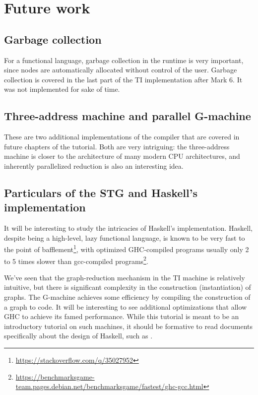 \section{Future work}
\label{sec:future-work}

\subsection{Garbage collection}
\label{sec:gc}

For a functional language, garbage collection in the runtime is very important, since nodes are automatically allocated without control of the user. Garbage collection is covered in the last part of the TI implementation after Mark 6. It was not implemented for sake of time.

\subsection{Three-address machine and parallel G-machine}
\label{sec:future-sections}

These are two additional implementations of the compiler that are covered in future chapters of the tutorial. Both are very intriguing: the three-address machine is closer to the architecture of many modern CPU architectures, and inherently parallelized reduction is also an interesting idea.

\subsection{Particulars of the STG and Haskell's implementation}
\label{sec:stg}

It will be interesting to study the intricacies of Haskell's implementation. Haskell, despite being a high-level, lazy functional language, is known to be very fast to the point of bafflement\footnote{\url{https://stackoverflow.com/q/35027952}}, with optimized GHC-compiled programs usually only 2 to 5 times slower than gcc-compiled programs\footnote{\url{https://benchmarksgame-team.pages.debian.net/benchmarksgame/fastest/ghc-gcc.html}}.

We've seen that the graph-reduction mechanism in the TI machine is relatively intuitive, but there is significant complexity in the construction (instantiation) of graphs. The G-machine achieves some efficiency by compiling the construction of a graph to code. It will be interesting to see additional optimizations that allow GHC to achieve its famed performance. While this tutorial is meant to be an introductory tutorial on such machines, it should be formative to read documents specifically about the design of Haskell, such as \cite{jones1992implementing}.

